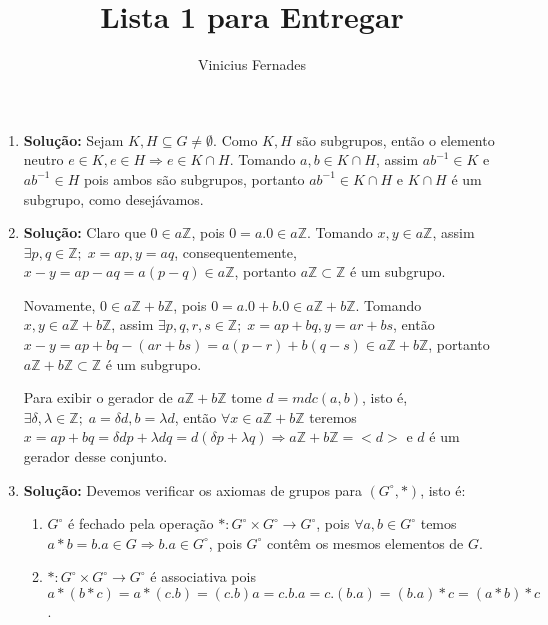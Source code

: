 \documentclass{article}
\begin{document}
	
\title{Lista 1 para Entregar}
\author{Vinicius Fernades}
	
\maketitle
	
\begin{enumerate}
	\item \textbf{Solução:} Sejam $K, H \subseteq G \neq \emptyset$. Como $K,H$ são subgrupos, então o elemento neutro $e \in K, e\in H \Rightarrow e \in K \cap H$. Tomando $a, b \in K \cap H$, assim $ab^{-1} \in K$ e $ab^{-1} \in H$ pois ambos são subgrupos, portanto $ab^{-1} \in K \cap H$ e $K \cap H$ é um subgrupo, como desejávamos.
	
	\item \textbf{Solução:} Claro que $0 \in a\mathbb{Z}$, pois $0 = a.0 \in a\mathbb{Z}$. Tomando $x,y \in a\mathbb{Z}$, assim $\exists p,q \in \mathbb{Z}; \; x=ap, y=aq$, consequentemente, $x-y = ap - aq = a(p-q) \in a \mathbb{Z}$, portanto $a \mathbb{Z} \subset \mathbb{Z}$ é um subgrupo.
	
	Novamente, $0 \in a\mathbb{Z} + b\mathbb{Z}$, pois $0 = a.0 +b.0 \in a\mathbb{Z} + b\mathbb{Z}$. Tomando $x,y \in a\mathbb{Z} + b\mathbb{Z}$, assim $\exists p,q,r,s \in \mathbb{Z}; \; x=ap +bq, y=ar+bs$, então $x-y = ap +bq - (ar+bs) = a(p-r) + b(q-s) \in a\mathbb{Z} + b\mathbb{Z}$, portanto $a\mathbb{Z} + b\mathbb{Z} \subset \mathbb{Z}$ é um subgrupo. 
	
	Para exibir o gerador de $a\mathbb{Z} + b\mathbb{Z}$ tome $d = mdc(a, b)$, isto é, $\exists \delta, \lambda \in \mathbb{Z}; \; a = \delta d, b = \lambda d$, então $\forall x \in a\mathbb{Z} + b\mathbb{Z}$ teremos $x= ap+bq = \delta dp +\lambda dq = d(\delta p +\lambda q) \Rightarrow a\mathbb{Z} + b\mathbb{Z} = <d>$ e $d$ é um gerador desse conjunto.
	
	\item \textbf{Solução:} Devemos verificar os axiomas de grupos para $(G^{\circ},*)$, isto é:
		\begin{enumerate}
			\item $G^{\circ}$ é fechado pela operação $*: G^{\circ} \times G^{\circ} \to G^{\circ}$, pois $\forall a, b \in G^{\circ}$ temos $a*b = b.a \in G \Rightarrow b.a \in G^{\circ}$, pois $G^{\circ}$ contêm os mesmos elementos de $G$.
			
			\item $*: G^{\circ} \times G^{\circ} \to G^{\circ}$ é associativa pois $a*(b*c) = a*(c.b) = (c.b)a = c.b.a = c.(b.a) = (b.a)*c = (a*b)*c$.
			

\end{enumerate}
\end{enumerate}
\end{document}
